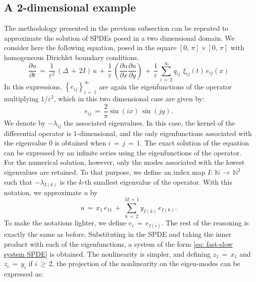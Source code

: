 \subsection{A 2-dimensional example}
\label{sub:numerical_example 2D}
The methodology presented in the previous subsection can be repeated to approximate the solution of SPDEs posed in a two dimensional domain. We consider here the following equation, posed in the square $ [ 0,\,{\pi}]{\times}[ 0,\,{\pi}]$ with homogeneous Dirichlet boundary conditions.
\begin{equation*}
    \frac{{\partial}u}{{\partial}t} \,=\,\frac{1}{{\varepsilon}^2}\, \left( {\Delta}\,+\,2I\right)\,u \,+\, \frac{1}{\varepsilon} \, \left(\frac{{\partial}u}{{\partial}x}\frac{{\partial}u}{{\partial}y}\right) \, +\, \frac{1}{\varepsilon} \, \sum_{ i\,=\,2}^{ {\infty}}  q_{ij}\,\,{\xi}_{ij}(t)\, e_{ij}(x)
\end{equation*}
In this expressions, $\left\{e_{ij}\right\}_{i\,=\,1}^{\infty}$ are again the eigenfunctions of the operator multiplying $1/{\varepsilon}^2$, which in this two dimensional case are given by:
\begin{equation*}
    e_{ij} \,=\, \frac{2}{\pi} \sin\left(i x\right) \, \sin\left(j y\right).
\end{equation*}
We denote by $-{\lambda}_{ ij }$ the associated eigenvalues. In this case, the kernel of the differential operator is 1-dimensional, and the only eigenfunctions associated with the eigenvalue 0 is obtained when $i\,=\,j\,=\,1$. The exact solution of the equation can be expressed by an infinite series using the eigenfunctions of the operator. For the numerical solution, however, only the modes associated with the lowest eigenvalues are retained. To that purpose, we define an index map $I: \, \mathbb N\, \to \, \mathbb N^2$ such that $-{\lambda}_{I(k)}$ is the $k$-th smallest eigenvalue of the operator. With this notation, we approximate $u$ by
\begin{equation*}
    u \,=\, x_1\,e_{11} \,+\, \sum_{ k\,=\,2}^{ M\,+\,1} y_{I(k)} \, e_{I(k)}.
\end{equation*}
To make the notations lighter, we define $e_i \,=\, e_{I(i)}$. The rest of the reasoning is exactly the same as before. Substituting in the SPDE and taking the inner product with each of the eigenfunctions, a system of the form \eqref{eq: fast-slow system SPDE} is obtained. The nonlinearity is simpler, and defining $z_1 \,=\, x_1$ and $z_i \,=\,y_i$ if $i \,{\geq}\,2$, the projection of the nonlinearity on the eigen-modes can be expressed as:
